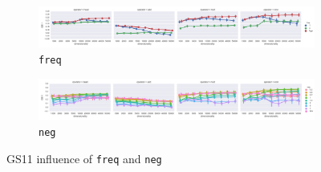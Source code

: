 \begin{figure}
  \centering

  \begin{subfigure}[t]{\textwidth}
    \includegraphics[width=1.1\textwidth]{supplement/figures/gs11-interaction-freq}

  \caption{\texttt{freq}}
  \label{fig:gs11-freq}
  \end{subfigure}

  \begin{subfigure}[t]{\textwidth}
    \includegraphics[width=1.1\textwidth]{supplement/figures/gs11-interaction-neg}

  \caption{\texttt{neg}}
  \label{fig:gs11-neg}
  \end{subfigure}

  \caption{GS11 influence of \texttt{freq} and \texttt{neg}}
\end{figure}
